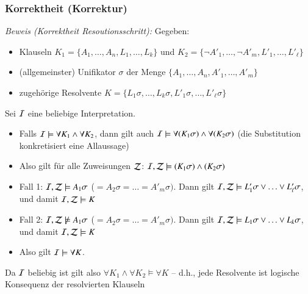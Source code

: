 \documentclass[onlymath]{beamer}
\begin{document}
\begin{frame}\frametitle{Korrektheit (Korrektur)}

\emph{Beweis (Korrektheit Resoutionsschritt):} Gegeben:
\begin{itemize}
\item Klauseln $K_1=\{A_1,\ldots,A_n,L_1,\ldots,L_k\}$ und $K_2=\{\neg A'_1,\ldots,\neg A'_m,L'_1,\ldots,L'_\ell\}$
\item (allgemeinster) Unifikator $\sigma$ der Menge $\{A_1,\ldots,A_n,A'_1,\ldots,A'_m\}$
\item zugehörige Resolvente $K=\{L_1\sigma,\ldots,L_k\sigma,L'_1\sigma,\ldots, L'_\ell\sigma\}$\pause
\end{itemize}

Sei $\mathcal{I}$ eine beliebige Interpretation.
\begin{itemize}
\item Falls $\mathcal{I}\models\forall K_1\wedge\forall K_2$, dann gilt auch $\mathcal{I}\models\forall (K_1\sigma)\wedge\forall (K_2\sigma)$ (die Substitution konkretisiert eine Allaussage)
\item Also gilt für alle Zuweisungen $\mathcal{Z}$: $\mathcal{I},\mathcal{Z}\models(K_1\sigma)\wedge (K_2\sigma)$
\item Fall 1: $\mathcal{I},\mathcal{Z}\models A_1\sigma$ ($=A_2\sigma=\ldots=A'_m\sigma)$. Dann gilt $\mathcal{I},\mathcal{Z}\models L'_1\sigma\vee\ldots\vee L'_\ell\sigma$, und damit $\mathcal{I},\mathcal{Z}\models K$
\item Fall 2: $\mathcal{I},\mathcal{Z}\not\models A_1\sigma$ ($=A_2\sigma=\ldots=A'_m\sigma)$. Dann gilt $\mathcal{I},\mathcal{Z}\models L_1\sigma\vee\ldots\vee L_k\sigma$, und damit $\mathcal{I},\mathcal{Z}\models K$
\item Also gilt $\mathcal{I}\models\forall K$.
\end{itemize}
Da $\mathcal{I}$ beliebig ist gilt also $\forall K_1\wedge\forall K_2\models \forall K$
-- d.h., jede Resolvente ist logische Konsequenz der resolvierten Klauseln

\end{frame}

\end{document}

